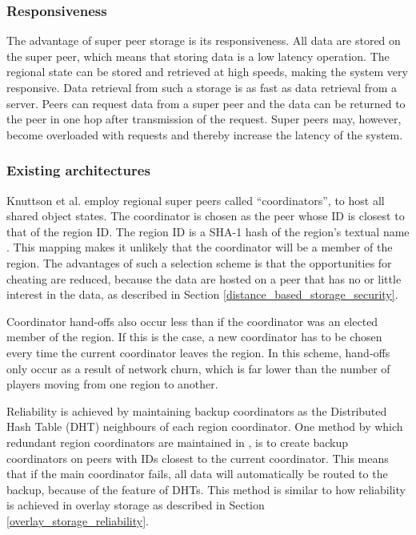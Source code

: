 \subsubsection{Responsiveness}
The advantage of super peer storage is its responsiveness. All data are stored on the super peer, which means that storing data is a low latency operation. The regional state can be stored and retrieved at high speeds, making the system very responsive. Data retrieval from such a storage is as fast as data retrieval from a server. Peers can request data from a super peer and the data can be returned to the peer in one hop after transmission of the request. Super peers may, however, become overloaded with requests and thereby increase the latency of the system.

\subsubsection{Existing architectures}

Knuttson et al. \cite{knutsson_p2p_first} employ regional super peers called ``coordinators'', to host all shared object states. The coordinator is chosen as the peer whose ID is closest to that of the region ID. The region ID is a SHA-1 hash of the region's textual name \cite{SHA}. This mapping makes it unlikely that the coordinator will be a member of the region. The advantages of such a selection scheme is that the opportunities for cheating are reduced, because the data are hosted on a peer that has no or little interest in the data, as described in Section
\ref{distance_based_storage_security}.

Coordinator hand-offs also occur less than if the coordinator was an elected member of the region. If this is the case, a new coordinator has to be chosen every time the current coordinator leaves the region. In this scheme, hand-offs only occur as a result of network churn, which is far lower than the number of players moving from one region to another.

Reliability is achieved by maintaining backup coordinators as the Distributed Hash Table (DHT) neighbours of each region coordinator. One method by which redundant region coordinators are maintained in \cite{knutsson_p2p_first}, is to create backup coordinators on peers with IDs closest to the current coordinator. This means that if the main coordinator fails, all data will automatically be routed to the backup, because of the feature of DHTs. This method is similar to how reliability is achieved in overlay storage as described in Section \ref{overlay_storage_reliability}.

